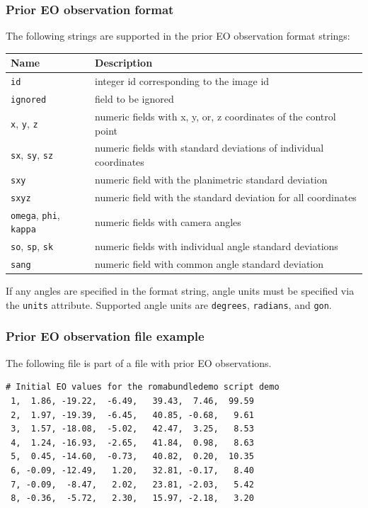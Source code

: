 \documentclass{article}
\begin{document}
\newpage
\subsubsection{Prior EO observation format}
\label{sec:eoFormat}
The following strings are supported in the prior EO observation format
strings:
\begin{center}
\begin{tabular}{l|l}
Name & Description\\
\hline
\texttt{id} & integer id corresponding to the image id\\
\texttt{ignored} & field to be ignored\\
\texttt{x}, \texttt{y}, \texttt{z} & numeric fields with x, y, or, z coordinates of the control point\\
\texttt{sx}, \texttt{sy}, \texttt{sz} & numeric fields with standard deviations of individual coordinates\\
\texttt{sxy} & numeric field with the planimetric standard deviation\\
\texttt{sxyz} & numeric field with the standard deviation for all coordinates\\
\texttt{omega}, \texttt{phi}, \texttt{kappa} & numeric fields with camera angles\\
\texttt{so}, \texttt{sp}, \texttt{sk} & numeric fields with individual angle standard deviations\\
\texttt{sang} & numeric field with common angle standard deviation\\
\end{tabular}
\end{center}

If any angles are specified in the format string, angle units must be
specified via the \texttt{units} attribute. Supported angle units are
\texttt{degrees}, \texttt{radians}, and \texttt{gon}.
\subsubsection{Prior EO observation file example}
\label{sec:eoExample}
The following file is part of a file with prior EO observations.
\begin{verbatim}
# Initial EO values for the romabundledemo script demo
 1,  1.86, -19.22,  -6.49,   39.43,  7.46,  99.59
 2,  1.97, -19.39,  -6.45,   40.85, -0.68,   9.61
 3,  1.57, -18.08,  -5.02,   42.47,  3.25,   8.53
 4,  1.24, -16.93,  -2.65,   41.84,  0.98,   8.63
 5,  0.45, -14.60,  -0.73,   40.82,  0.20,  10.35
 6, -0.09, -12.49,   1.20,   32.81, -0.17,   8.40
 7, -0.09,  -8.47,   2.02,   23.81, -2.03,   5.42
 8, -0.36,  -5.72,   2.30,   15.97, -2.18,   3.20
\end{verbatim}
\end{document}
